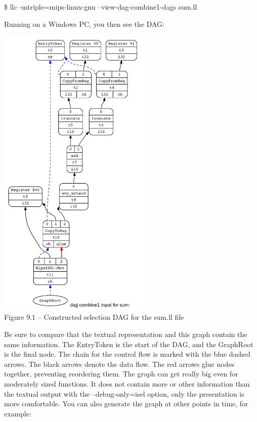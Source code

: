 \begin{tcolorbox}[colback=white,colframe=black]
\$ llc -mtriple=mips-linux-gnu –view-dag-combine1-dags sum.ll
\end{tcolorbox}

Running on a Windows PC, you then see the DAG:\par

\hspace*{\fill} \par %
\begin{center}
\includegraphics[width=0.55\textwidth]{content/3/chapter9/images/1.jpg}\\
Figure 9.1 – Constructed selection DAG for the sum.ll file
\end{center}

Be sure to compare that the textual representation and this graph contain the same information. The EntryToken is the start of the DAG, and the GraphRoot is the final node. The chain for the control flow is marked with the blue dashed arrows. The black arrows denote the data flow. The red arrows glue nodes together, preventing reordering them. The graph can get really big even for moderately sized functions. It does not contain more or other information than the textual output with the –debug-only=isel option, only the presentation is more comfortable. You can also generate the graph at other points in time, for example:\par

